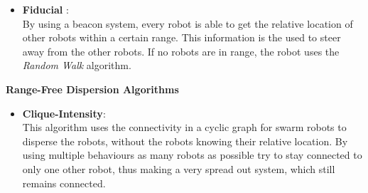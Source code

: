 \begin{itemize}
		\item \textbf{Fiducial} \cite{morlok2007dispersing}:\\
			By using a beacon system, every robot is able to get the relative location of other robots within a certain range. This information is the used to steer away from the other robots. If no robots are in range, the robot uses the \emph{Random Walk} algorithm.
	\end{itemize}
	\textbf{Range-Free Dispersion Algorithms}
	\begin{itemize}
		\item \textbf{Clique-Intensity}\cite{ludwig2006robotic}:\\
			This algorithm uses the connectivity in a cyclic graph for swarm robots to disperse the robots, without the robots knowing their relative location. By using multiple behaviours as many robots as possible try to stay connected to only one other robot, thus making a very spread out system, which still remains connected.
	\end{itemize}